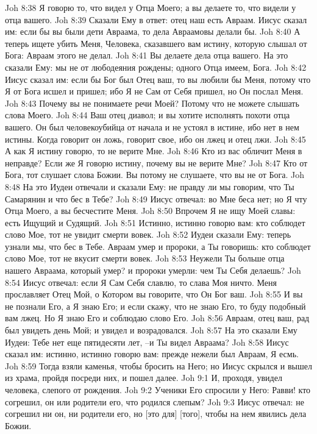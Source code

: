 Joh 8:38  Я говорю то, что видел у Отца Моего; а вы делаете то, что видели у отца вашего.
Joh 8:39  Сказали Ему в ответ: отец наш есть Авраам. Иисус сказал им: если бы вы были дети Авраама, то дела Авраамовы делали бы.
Joh 8:40  А теперь ищете убить Меня, Человека, сказавшего вам истину, которую слышал от Бога: Авраам этого не делал.
Joh 8:41  Вы делаете дела отца вашего. На это сказали Ему: мы не от любодеяния рождены; одного Отца имеем, Бога.
Joh 8:42  Иисус сказал им: если бы Бог был Отец ваш, то вы любили бы Меня, потому что Я от Бога исшел и пришел; ибо Я не Сам от Себя пришел, но Он послал Меня.
Joh 8:43  Почему вы не понимаете речи Моей? Потому что не можете слышать слова Моего.
Joh 8:44  Ваш отец диавол; и вы хотите исполнять похоти отца вашего. Он был человекоубийца от начала и не устоял в истине, ибо нет в нем истины. Когда говорит он ложь, говорит свое, ибо он лжец и отец лжи.
Joh 8:45  А как Я истину говорю, то не верите Мне.
Joh 8:46  Кто из вас обличит Меня в неправде? Если же Я говорю истину, почему вы не верите Мне?
Joh 8:47  Кто от Бога, тот слушает слова Божии. Вы потому не слушаете, что вы не от Бога.
Joh 8:48  На это Иудеи отвечали и сказали Ему: не правду ли мы говорим, что Ты Самарянин и что бес в Тебе?
Joh 8:49  Иисус отвечал: во Мне беса нет; но Я чту Отца Моего, а вы бесчестите Меня.
Joh 8:50  Впрочем Я не ищу Моей славы: есть Ищущий и Судящий.
Joh 8:51  Истинно, истинно говорю вам: кто соблюдет слово Мое, тот не увидит смерти вовек.
Joh 8:52  Иудеи сказали Ему: теперь узнали мы, что бес в Тебе. Авраам умер и пророки, а Ты говоришь: кто соблюдет слово Мое, тот не вкусит смерти вовек.
Joh 8:53  Неужели Ты больше отца нашего Авраама, который умер? и пророки умерли: чем Ты Себя делаешь?
Joh 8:54  Иисус отвечал: если Я Сам Себя славлю, то слава Моя ничто. Меня прославляет Отец Мой, о Котором вы говорите, что Он Бог ваш.
Joh 8:55  И вы не познали Его, а Я знаю Его; и если скажу, что не знаю Его, то буду подобный вам лжец. Но Я знаю Его и соблюдаю слово Его.
Joh 8:56  Авраам, отец ваш, рад был увидеть день Мой; и увидел и возрадовался.
Joh 8:57  На это сказали Ему Иудеи: Тебе нет еще пятидесяти лет, --и Ты видел Авраама?
Joh 8:58  Иисус сказал им: истинно, истинно говорю вам: прежде нежели был Авраам, Я есмь.
Joh 8:59  Тогда взяли каменья, чтобы бросить на Него; но Иисус скрылся и вышел из храма, пройдя посреди них, и пошел далее.
Joh 9:1  И, проходя, увидел человека, слепого от рождения.
Joh 9:2  Ученики Его спросили у Него: Равви! кто согрешил, он или родители его, что родился слепым?
Joh 9:3  Иисус отвечал: не согрешил ни он, ни родители его, но [это для] [того], чтобы на нем явились дела Божии.
